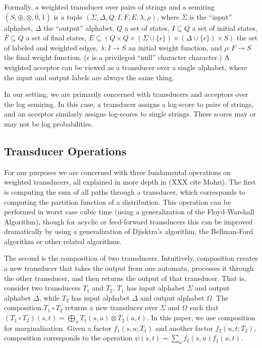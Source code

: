 \documentclass[11pt,a4paper]{article}
\begin{document}
Formally, a weighted transducer over pairs of strings and a semiring
$(S,\oplus,\otimes,\bar 0, \bar 1)$ is a tuple
$(\Sigma,\Delta,Q,I,F,E,\lambda,\rho)$, where $\Sigma$ is the
``input'' alphabet, $\Delta$ the ``output'' alphabet, $Q$ a set of
states, $I \subseteq Q$ a set of initial states, $F \subseteq Q$ a
set of final states, $E \subseteq (Q \times Q \times (\Sigma \cup
\{\epsilon\}) \times (\Delta\cup \{\epsilon\}) \times S)$ the set
of labeled and weighted edges, $\lambda: I \rightarrow S$ an initial
weight function, and $\rho: F \rightarrow S$ the final weight
function. ($\epsilon$ is a privileged ``null'' character character.)
A weighted acceptor can be viewed as a transducer over a single
alphabet, where the input and output labels are always the same
thing.

In our setting, we are primarily concerned with transducers and
acceptors over the log semiring. In this case, a transducer assigns
a log-score to pairs of strings, and an acceptor similarly assigns
log-scores to single strings. These scores may or may not be
log probabilities.

\subsection{Transducer Operations}

For our purposes we are concerned with three fundamental operations
on weighted transducers, all explained in more depth in (XXX cite
Mohri). The first is computing the sum of all paths through a
transducer, which corresponds to computing the partition function
of a distribution. This operation can be performed in worst case
cubic time (using a generalization of the Floyd-Warshall Algorithm),
though for acyclic or feed-forward transducers this can be improved
dramatically by using a generalization of Djisktra's algorithm, the
Bellman-Ford algorithm or other related algorithms.

The second is the composition of two transducers. Intuitively,
composition creates a new transducer that takes the output from one
automata, processes it through the other transducer, and then returns
the output of that transducer. That is, consider two transducers
$T_1$ and $T_2$. $T_1$ has input alphabet $\Sigma$ and output
alphabet $\Delta$, while $T_2$ has input alphabet $\Delta$ and
output alphabet $\Omega$. The composition $T_1 \circ T_2$ returns
a new transducer over $\Sigma$ and $\Omega$ such that $(T_1 \circ
T_2)(s,t) = \bigoplus_{u} T_1(s,u)\otimes T_2(u,t)$. In this paper,
we use composition for marginalization. Given a factor $f_1(s,u;T_1)$
and another factor $f_2(u,t;T_2)$, composition corresponds to the
operation $\psi(s,t) = \sum_u f_1(s,u) f_2(u,t)$.
\end{document}
